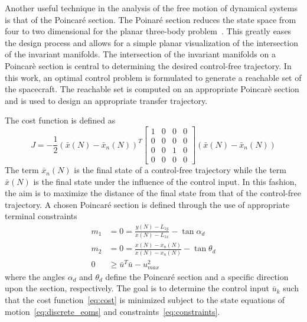 \documentclass[letterpaper, preprint, paper,11pt]{AAS}	%
\begin{document}
Another useful technique in the analysis of the free motion of dynamical systems is that of the Poincar\'e section.
The Poinar\'e section reduces the state space from four to two dimensional for the planar three-body problem~\cite{koon2001}.
This greatly eases the design process and allows for a simple planar visualization of the intersection of the invariant manifolds.
The intersection of the invariant manifolds on a Poincar\`e section is central to determining the desired control-free trajectory.
In this work, an optimal control problem is formulated to generate a reachable set of the spacecraft.
The reachable set is computed on an appropriate Poincar\`e section and is used to design an appropriate transfer trajectory.

The cost function is defined as
\begin{equation}
	J = -\frac{1}{2} \left( \bar{x}(N) - \bar{x}_{n}(N)\right)^T 
	\left[
	\begin{array}{cccc}
		1 & 0& 0& 0 \\
		 0& 0& 0& 0\\
		 0 & 0 & 1 &0\\
		 0 & 0& 0& 0
	\end{array}
	\right]
	\left( \bar{x}(N) - \bar{x}_{n}(N)\right)
	\label{eq:cost}
\end{equation}
The term \( \bar{x}_n(N) \) is the final state of a control-free trajectory while the term \( \bar{x}(N) \) is the final state under the influence of the control input.
In this fashion, the aim is to maximize the distance of the final state from that of the control-free trajectory. 
A chosen Poincar\'e section is defined through the use of appropriate terminal constraints
\begin{subequations}
\begin{align}
    m_1 &= 0 = \frac{y(N) - L_{1y}}{x(N) - L_{1x}} - \tan{\alpha_d} \\ 
    m_2&= 0 = \frac{\dot{x}(N) - \dot{x_n}(N) }{x(N) -x_n(N) } - \tan{\theta_d} \\
	 0 &\geq\bar{u}^T \bar{u} - u_{max}^2 
\end{align}
    \label{eq:constraints}
\end{subequations}
where the angles \( \alpha_d\) and \( \theta_d\) define the Poincar\'e section and a specific direction upon the section, respectively. 
The goal is to determine the control input \( \bar{u}_k\) such that the cost function~\cref{eq:cost} is minimized subject to the state equations of motion~\cref{eq:discrete_eoms} and constraints~\cref{eq:constraints}.
\end{document}
